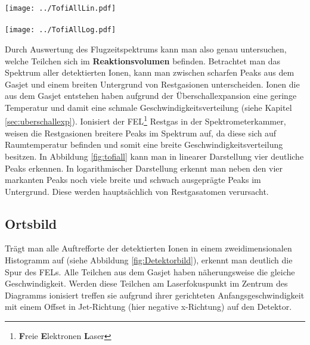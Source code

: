 \begin{center}
\begin{minipage}{\linewidth}
\centering
\texttt{[image: ../TofiAllLin.pdf]} \\ ~\\
\texttt{[image: ../TofiAllLog.pdf]}%
 \label{fig:tofiall}
\end{minipage} 
\end{center} 
Durch Auswertung des Flugzeitspektrums kann man also genau untersuchen, welche Teilchen sich im \textbf{Reaktionsvolumen} befinden. Betrachtet man das Spektrum aller detektierten Ionen, kann man zwischen scharfen Peaks aus dem Gasjet und einem breiten Untergrund von Restgasionen unterscheiden. Ionen die aus dem Gasjet entstehen haben aufgrund der Überschallexpansion eine geringe Temperatur und damit eine schmale Geschwindigkeitsverteilung (siehe Kapitel \ref{sec:uberschallexp}). Ionisiert der FEL\footnote{\textbf{F}reie \textbf{E}lektronen \textbf{L}aser} Restgas in der Spektrometerkammer, weisen die Restgasionen breitere Peaks im Spektrum auf, da diese sich auf Raumtemperatur befinden und somit eine breite Geschwindigkeitsverteilung besitzen. In Abbildung \ref{fig:tofiall} kann man in linearer Darstellung vier deutliche Peaks erkennen. In logarithmischer Darstellung erkennt man neben den vier markanten Peaks noch viele breite und schwach ausgeprägte Peaks im Untergrund. Diese werden hauptsächlich von Restgasatomen verursacht.
\subsection{Ortsbild}

Trägt man alle Auftrefforte der detektierten Ionen in einem zweidimensionalen Histogramm auf (siehe Abbildung \ref{fig:Detektorbild}), erkennt man deutlich die Spur des FELs. Alle Teilchen aus dem Gasjet haben näherungsweise die gleiche Geschwindigkeit. Werden diese Teilchen am Laserfokuspunkt im Zentrum des Diagramms ionisiert treffen sie aufgrund ihrer gerichteten Anfangsgeschwindigkeit mit einem Offset in Jet-Richtung (hier negative x-Richtung) auf den Detektor.


